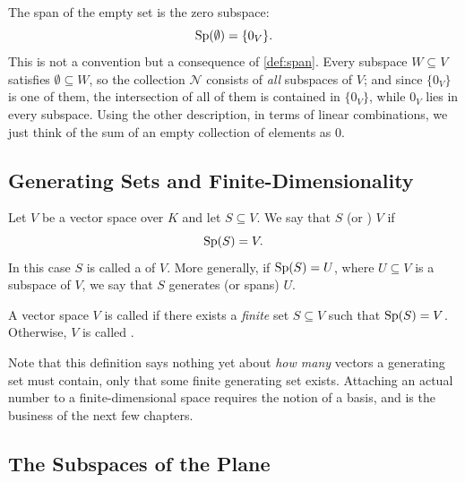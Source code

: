 \begin{remark}
\label{rem:span_of_empty_set}
The span of the empty set is the zero subspace:
\[
\operatorname{Sp}(\emptyset) = \{0_V\}.
\]
This is not a convention but a consequence of \cref{def:span}. Every subspace $W \subseteq V$ satisfies $\emptyset \subseteq W$, so the collection $\mathcal{N}$ consists of \emph{all} subspaces of $V$; and since $\{0_V\}$ is one of them, the intersection of all of them is contained in $\{0_V\}$, while $0_V$ lies in every subspace. Using the other description, in terms of linear combinations, we just think of the sum of an empty collection of elements as $0$.
\end{remark}

\subsection{Generating Sets and Finite-Dimensionality}

\begin{definition}
\label{def:generating_set}
Let $V$ be a vector space over $K$ and let $S \subseteq V$. We say that $S$  (or ) $V$ if
\[
\operatorname{Sp}(S) = V.
\]
In this case $S$ is called a  of $V$. More generally, if $\operatorname{Sp}(S) = U$, where $U \subseteq V$ is a subspace of $V$, we say that $S$ generates (or spans) $U$.
\end{definition}

\begin{definition}
\label{def:finite_dimensional}
A vector space $V$ is called  if there exists a \emph{finite} set $S \subseteq V$ such that $\operatorname{Sp}(S) = V$. Otherwise, $V$ is called .
\end{definition}

\begin{importantremark}
\label{rem:finite_dim_no_number_yet}
Note that this definition says nothing yet about \emph{how many} vectors a generating set must contain, only that some finite generating set exists. Attaching an actual number to a finite-di\-men\-sional space requires the notion of a basis, and is the business of the next few chapters.
\end{importantremark}

\subsection{The Subspaces of the Plane}

